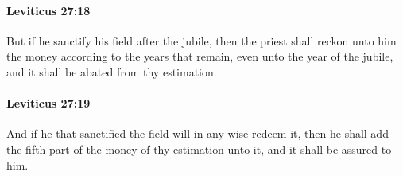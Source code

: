 		\paragraph{Leviticus 27:18} %
			\label{LEVITICUS-27-18}

			But if he sanctify his field after the jubile, then the priest shall reckon unto him the money according to the years that remain, even unto the year of the jubile, and it shall be abated from thy estimation.


		\paragraph{Leviticus 27:19} %
			\label{LEVITICUS-27-19}

			And if he that sanctified the field will in any wise redeem it, then he shall add the fifth part of the money of thy estimation unto it, and it shall be assured to him.

